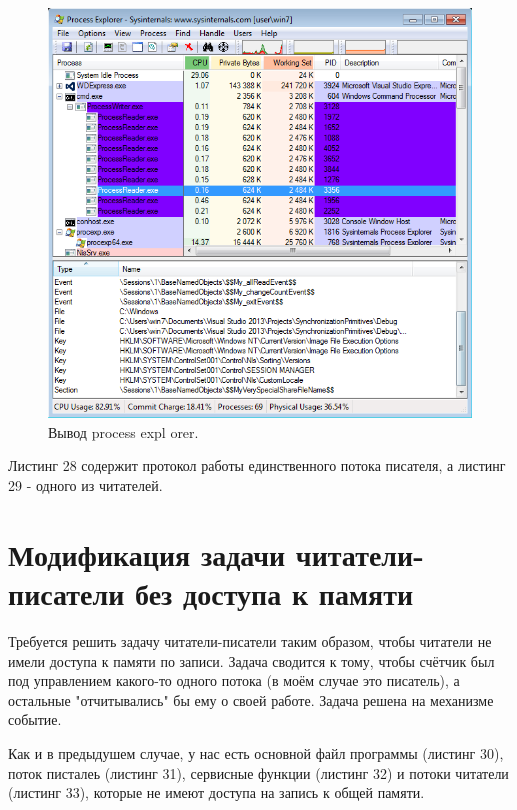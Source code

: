 \documentclass[a4paper, 12pt]{article}		%
\begin{document}
\begin{figure}[h!]
\centering
\includegraphics[scale=0.45]{res/pe_07}
\caption{Вывод process expl
orer.}
\end{figure}
\newpage

Листинг 28 содержит протокол работы единственного потока писателя, а листинг 29 - одного из читателей.





\newpage
\section{Модификация задачи читатели-писатели без доступа к памяти}

Требуется решить задачу читатели-писатели таким образом, чтобы читатели не имели доступа к памяти по записи. Задача сводится к тому, чтобы счётчик был под управлением какого-то одного потока (в моём случае это писатель), а остальные "отчитывались" бы ему о своей работе. Задача решена на механизме событие.

Как и в предыдушем случае, у нас есть основной файл программы (листинг 30), поток писталеь (листинг 31), сервисные функции (листинг 32) и потоки читатели (листинг 33), которые не имеют доступа на запись к общей памяти.
\end{document}
